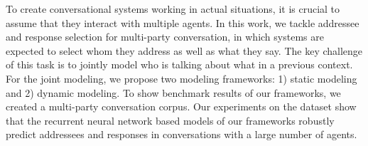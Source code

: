 To create conversational systems working in actual situations, it is crucial to assume that they interact with multiple agents. In this work, we tackle addressee and response selection for multi-party conversation, in which systems are expected to select whom they address as well as what they say. The key challenge of this task is to jointly model who is talking about what in a previous context. For the joint modeling, we propose two modeling frameworks: 1) static modeling and 2) dynamic modeling. To show benchmark results of our frameworks, we created a multi-party conversation corpus. Our experiments on the dataset show that the recurrent neural network based models of our frameworks robustly predict addressees and responses in conversations with a large number of agents.
